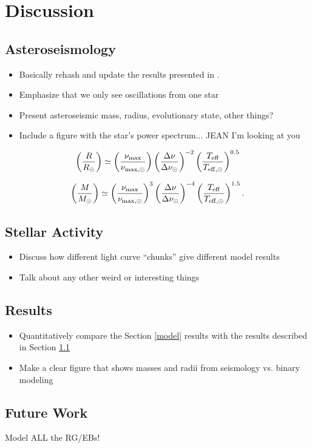 \section{Discussion}\label{discuss}

\subsection{Asteroseismology}\label{seismo}
\begin{itemize}
\item Basically rehash and update the results presented in \citet{gau14}.
\item Emphasize that we only see oscillations from one star
\item Present asteroseismic mass, radius, evolutionary state, other things?
\item Include a figure with the star's power spectrum... JEAN I'm looking at you
\end{itemize}

\begin{equation}
\left( \frac{R}{R_\odot} \right) \simeq \left( \frac{\nu_{\rm{max}}}{\nu_{\rm{max,\odot}}} \right) \left( \frac{\Delta \nu}{\Delta \nu_\odot} \right)^{-2} \left( \frac{T_{\rm{eff}}}{T_{\rm{eff,\odot}}} \right)^{0.5}
\end{equation}

\begin{equation}
\left( \frac{M}{M_\odot} \right) \simeq \left( \frac{\nu_{\rm{max}}}{\nu_{\rm{max,\odot}}} \right)^3 \left( \frac{\Delta \nu}{\Delta \nu_\odot} \right)^{-4} \left( \frac{T_{\rm{eff}}}{T_{\rm{eff,\odot}}} \right)^{1.5}.
\end{equation}

\subsection{Stellar Activity}
\begin{itemize}
\item Discuss how different light curve ``chunks'' give different model results
\item Talk about any other weird or interesting things
\end{itemize}

\subsection{Results}\label{results}
\begin{itemize}
\item Quantitatively compare the Section \ref{model} results with the \citet{gau14} results described in Section \ref{seismo}
\item Make a clear figure that shows masses and radii from seismology vs. binary modeling
\end{itemize}

\subsection{Future Work}\label{future}
Model ALL the RG/EBs!
